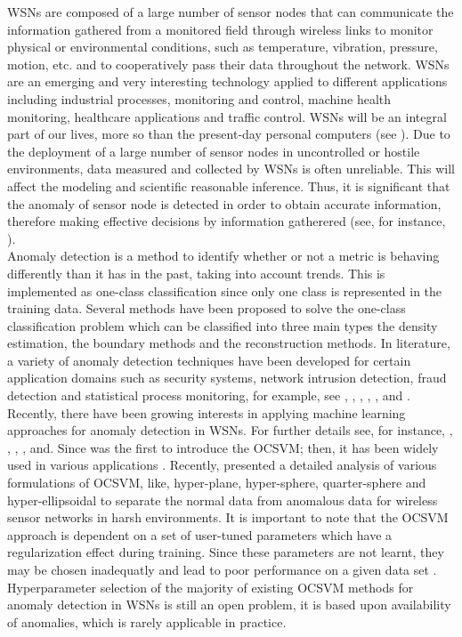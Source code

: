 \documentclass[conference]{IEEEtran}
\begin{document}
WSNs are composed of a large number of sensor nodes that can communicate the information gathered from a monitored field through wireless links to monitor physical or environmental conditions, such as temperature, vibration, pressure, motion, etc. and to cooperatively pass their data throughout the network. WSNs are an emerging and very interesting technology applied to different applications including industrial processes, monitoring and control, machine health monitoring, healthcare applications and traffic control. WSNs will be an integral part of our lives, more so than the present-day personal computers (see \cite{Xie2011}). Due to the deployment of a large number of sensor nodes in uncontrolled or hostile environments, data measured and collected by WSNs is often unreliable. This will affect the modeling and scientific reasonable inference. Thus, it is significant that the anomaly of sensor node is detected in order to obtain accurate information, therefore making effective decisions by information gatherered (see, for instance, \cite{sharma2010sensor}).\\

Anomaly detection is a method to identify whether or not a metric is behaving differently than it has in the past, taking into account trends. This is implemented as one-class classification since only one class is represented in the training data. Several methods have been proposed to solve the one-class classification problem which can be classified into three main types the density estimation, the boundary methods and the reconstruction methods. In literature, a variety of anomaly detection techniques have been developed for certain application domains such as security systems, network intrusion detection, fraud detection and statistical process monitoring, for example, see \cite{ilonen2006gaussian}, \cite{clifton2011novelty}, \cite{Tran2015a}, \cite{Tran2015b}, \cite{Chandola2016}, \cite{Tran2016} and \cite{Tran2016c}. Recently, there have been growing interests in applying machine learning approaches for anomaly detection in WSNs. For further details see, for instance, \cite{sharma2010sensor}, \cite{Xie2011}, \cite{Rajasegarar2014}, \cite{Chandola2016}, and\cite{feng2017new}. Since  \cite{scholkopf2001estimating} was the first to introduce the OCSVM; then, it has been widely used in various applications \cite{wang2004anomaly, rabaoui2008using, metzler2014detection}. Recently, \cite{shahid2015one} presented a detailed analysis of various formulations of OCSVM, like, hyper-plane, hyper-sphere, quarter-sphere and hyper-ellipsoidal to separate the normal data from anomalous data for wireless sensor networks in harsh environments. 
It is important to note that the OCSVM approach is dependent on a set of user-tuned parameters which have a regularization 
effect during training.  Since these parameters are not learnt, they may be chosen inadequatly 
and lead to poor performance on a given data set \cite{rabaoui2008using}. 
Hyperparameter selection of the majority of existing OCSVM methods for anomaly 
detection in WSNs is still an open problem, it is based upon availability of 
anomalies, which is rarely applicable in practice.\\
\end{document}
